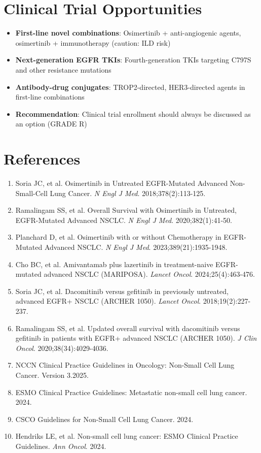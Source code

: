 \documentclass[10pt,letterpaper]{article}
\begin{document}
\section{Clinical Trial Opportunities}

\begin{itemize}
\item \textbf{First-line novel combinations}: Osimertinib + anti-angiogenic agents, osimertinib + immunotherapy (caution: ILD risk)
\item \textbf{Next-generation EGFR TKIs}: Fourth-generation TKIs targeting C797S and other resistance mutations
\item \textbf{Antibody-drug conjugates}: TROP2-directed, HER3-directed agents in first-line combinations
\item \textbf{Recommendation}: Clinical trial enrollment should always be discussed as an option (GRADE R)
\end{itemize}

\section{References}

{\small
\begin{enumerate}
\item Soria JC, et al. Osimertinib in Untreated EGFR-Mutated Advanced Non-Small-Cell Lung Cancer. \textit{N Engl J Med}. 2018;378(2):113-125.
\item Ramalingam SS, et al. Overall Survival with Osimertinib in Untreated, EGFR-Mutated Advanced NSCLC. \textit{N Engl J Med}. 2020;382(1):41-50.
\item Planchard D, et al. Osimertinib with or without Chemotherapy in EGFR-Mutated Advanced NSCLC. \textit{N Engl J Med}. 2023;389(21):1935-1948.
\item Cho BC, et al. Amivantamab plus lazertinib in treatment-naive EGFR-mutated advanced NSCLC (MARIPOSA). \textit{Lancet Oncol}. 2024;25(4):463-476.
\item Soria JC, et al. Dacomitinib versus gefitinib in previously untreated, advanced EGFR+ NSCLC (ARCHER 1050). \textit{Lancet Oncol}. 2018;19(2):227-237.
\item Ramalingam SS, et al. Updated overall survival with dacomitinib versus gefitinib in patients with EGFR+ advanced NSCLC (ARCHER 1050). \textit{J Clin Oncol}. 2020;38(34):4029-4036.
\item NCCN Clinical Practice Guidelines in Oncology: Non-Small Cell Lung Cancer. Version 3.2025.
\item ESMO Clinical Practice Guidelines: Metastatic non-small cell lung cancer. 2024.
\item CSCO Guidelines for Non-Small Cell Lung Cancer. 2024.
\item Hendriks LE, et al. Non-small cell lung cancer: ESMO Clinical Practice Guidelines. \textit{Ann Oncol}. 2024.
\end{enumerate}
}
\end{document}
